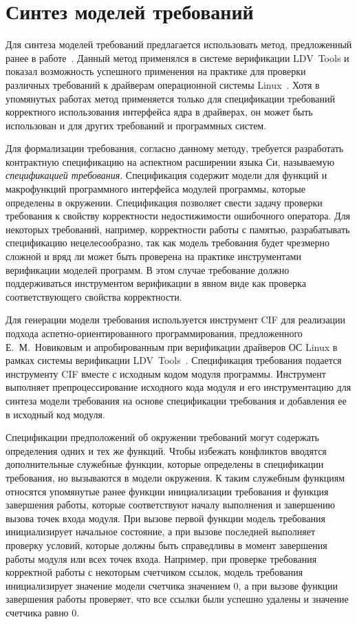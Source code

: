 \section{Синтез моделей требований}

Для синтеза моделей требований предлагается использовать метод, предложенный ранее в работе~\cite{NovikovDis}.
Данный метод применялся в системе верификации LDV~Tools и показал возможность успешного применения на практике для проверки различных требований к драйверам операционной системы Linux~\cite{Zakharov2015, configurable:Trudy}.
Хотя в упомянутых работах метод применяется только для спецификации требований корректного использования интерфейса ядра в драйверах, он может быть использован и для других требований и программных систем.

Для формализации требования, согласно данному методу, требуется разработать контрактную спецификацию на аспектном расширении языка Си, называемую \textit{спецификацией требования}.
Спецификация содержит модели для функций и макрофункций программного интерфейса модулей программы, которые определены в окружении.
Спецификация позволяет свести задачу проверки требования к свойству корректности недостижимости ошибочного оператора.
Для некоторых требований, например, корректности работы с памятью, разрабатывать спецификацию нецелесообразно, так как модель требования будет чрезмерно сложной и вряд ли может быть проверена на практике инструментами верификации моделей программ.
В этом случае требование должно поддерживаться инструментом верификации в явном виде как проверка соответствующего свойства корректности.

Для генерации модели требования используется инструмент CIF для реализации подхода аспетно-ориентированного программирования, предложенного Е.~М.~Новиковым и апробированным при верификации драйверов ОС Linux в рамках системы верификации LDV~Tools~\cite{Novikov2013}.
Спецификация требования подается инструменту CIF вместе с исходным кодом модуля программы.
Инструмент выполняет препроцессирование исходного кода модуля и его инструментацию для синтеза модели требования на основе спецификации требования и добавления ее в исходный код модуля.

Спецификации предположений об окружении требований могут содержать определения одних и тех же функций.
Чтобы избежать конфликтов вводятся дополнительные служебные функции, которые определены в спецификации требования, но вызываются в модели окружения.
К таким служебным функциям относятся упомянутые ранее функции инициализации требования и функция завершения работы, которые соответствуют началу выполнения и завершению вызова точек входа модуля.
При вызове первой функции модель требования инициализирует начальное состояние,
а при вызове последней выполняет проверку условий, которые должны быть справедливы в момент завершения работы модуля или всех точек входа.
Например, при проверке требования корректной работы с некоторым счетчиком ссылок, модель требования инициализирует значение модели счетчика значением 0, а при вызове функции завершения работы проверяет, что все ссылки были успешно удалены и значение счетчика равно 0.

